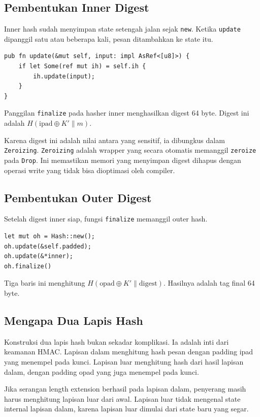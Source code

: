 \documentclass[11pt,a4paper]{article}
\begin{document}
\subsection{Pembentukan Inner Digest}

Inner hash sudah menyimpan state setengah jalan sejak \texttt{new}. Ketika \texttt{update} dipanggil satu atau beberapa kali, pesan ditambahkan ke state itu.

\begin{lstlisting}[style=code]
pub fn update(&mut self, input: impl AsRef<[u8]>) {
    if let Some(ref mut ih) = self.ih {
        ih.update(input);
    }
}
\end{lstlisting}

Panggilan \texttt{finalize} pada hasher inner menghasilkan digest 64 byte. Digest ini adalah $H(\text{ipad} \oplus K' \parallel m)$.

Karena digest ini adalah nilai antara yang sensitif, ia dibungkus dalam \texttt{Zeroizing}. \texttt{Zeroizing} adalah wrapper yang secara otomatis memanggil \texttt{zeroize} pada \texttt{Drop}. Ini memastikan memori yang menyimpan digest dihapus dengan operasi write yang tidak bisa dioptimasi oleh compiler.

\subsection{Pembentukan Outer Digest}

Setelah digest inner siap, fungsi \texttt{finalize} memanggil outer hash.

\begin{lstlisting}[style=code]
let mut oh = Hash::new();
oh.update(&self.padded);
oh.update(&*inner);
oh.finalize()
\end{lstlisting}

Tiga baris ini menghitung $H(\text{opad} \oplus K' \parallel \text{digest})$. Hasilnya adalah tag final 64 byte.

\subsection{Mengapa Dua Lapis Hash}

Konstruksi dua lapis hash bukan sekadar komplikasi. Ia adalah inti dari keamanan HMAC. Lapisan dalam menghitung hash pesan dengan padding ipad yang menempel pada kunci. Lapisan luar menghitung hash dari hasil lapisan dalam, dengan padding opad yang juga menempel pada kunci.

Jika serangan length extension berhasil pada lapisan dalam, penyerang masih harus menghitung lapisan luar dari awal. Lapisan luar tidak mengenal state internal lapisan dalam, karena lapisan luar dimulai dari state baru yang segar.
\end{document}
